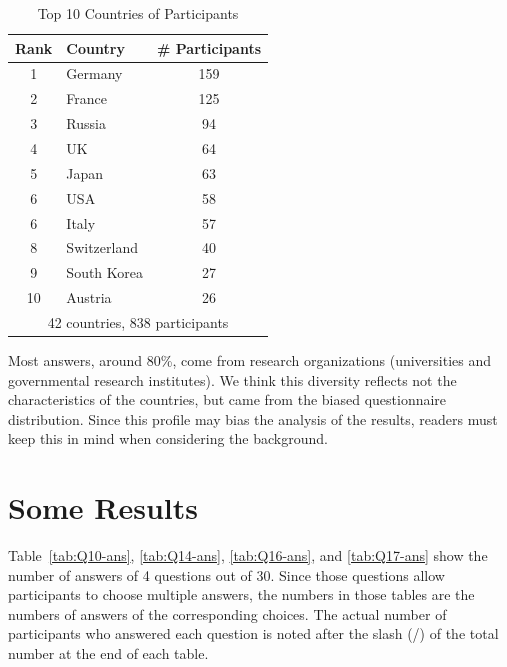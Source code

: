 \documentclass[sigconf,nonacm]{acmart}
\begin{document}
\begin{table}[htb]%
\begin{center}%
\caption{\small Top 10 Countries of Participants}
\vspace{-3mm}
\label{tab:countries}%
\begin{tabular}{c|l|c}%
\hline%
Rank & Country & \# Participants \\%
\hline%
1 & Germany 	& 159 \\%
2 & France 	& 125 \\%
3 & Russia 	& 94 \\%
4 & UK 		& 64 \\%
5 & Japan 	& 63 \\%
6 & USA 		& 58 \\%
6 & Italy 		& 57 \\%
\hline
8 & Switzerland & 40 \\%
9 & South Korea & 27 \\%
10 & Austria 	& 26  \\%
\hline%
\multicolumn{3}{c}{42 countries, 838 participants} \\%
\end{tabular}%
\end{center}%
\vspace{-5mm}
\end{table}%

Most answers, around 80\%, come from research organizations
(universities and governmental research institutes).  We think this
diversity reflects not the characteristics of the countries, but
came from the biased questionnaire distribution.
Since this profile may bias the analysis of the results,
readers must keep this in mind when considering the  background.

\section{Some Results}

Table~\ref{tab:Q10-ans}, \ref{tab:Q14-ans}, \ref{tab:Q16-ans}, and
\ref{tab:Q17-ans} show the number of answers of 4 questions out of
30. Since those questions allow participants to choose multiple answers,
the numbers in those tables are the numbers of answers of the
corresponding choices. The actual number of participants who answered
each question is noted after the slash (/) of the total number
at the end of each table.
\end{document}
